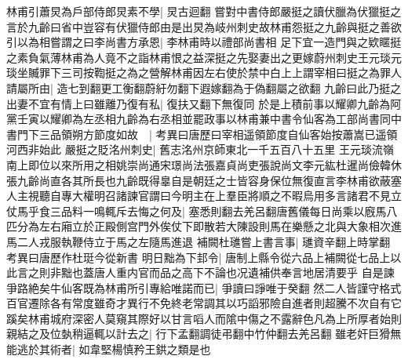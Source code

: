 林甫引蕭炅為戶部侍郎炅素不學|{
	炅古迴翻}
嘗對中書侍郎嚴挺之讀伏臘為伏獵挺之言於九齡曰省中豈容有伏獵侍郎由是出炅為岐州刺史故林甫怨挺之九齡與挺之善欲引以為相嘗謂之曰李尚書方承恩|{
	李林甫時以禮部尚書相}
足下宜一造門與之欵䁥挺之素負氣薄林甫為人竟不之詣林甫恨之益深挺之先娶妻出之更嫁蔚州刺史王元琰元琰坐贓罪下三司按鞫挺之為之營解林甫因左右使於禁中白上上謂宰相曰挺之為罪人請屬所由|{
	造七到翻更工衡翻蔚紆勿翻下遐嫁翻為于偽翻屬之欲翻}
九齡曰此乃挺之出妻不宜有情上曰雖離乃復有私|{
	復扶又翻下無復同}
於是上積前事以耀卿九齡為阿黨壬寅以耀卿為左丞相九齡為右丞相並罷政事以林甫兼中書令仙客為工部尚書同中書門下三品領朔方節度如故　|{
	考異曰唐歷曰宰相遥領節度自仙客始按蕭嵩已遥領河西非始此}
嚴挺之貶洺州刺史|{
	舊志洺州京師東北一千五百八十五里}
王元琰流嶺南上即位以來所用之相姚崇尚通宋璟尚法張嘉貞尚吏張說尚文李元紘杜暹尚儉韓休張九齡尚直各其所長也九齡既得辠自是朝廷之士皆容身保位無復直言李林甫欲蔽塞人主視聽自專大權明召諸諫官謂曰今明主在上羣臣將順之不暇烏用多言諸君不見立仗馬乎食三品料一鳴輒斥去悔之何及|{
	塞悉則翻去羌呂翻唐舊儀每日尚乘以廐馬八匹分為左右廂立於正殿側宫門外俟仗下即散若大陳設則馬在樂懸之北與大象相次進馬二人戎服執鞭侍立于馬之左隨馬進退}
補闕杜璡嘗上書言事|{
	璡資辛翻上時掌翻　考異曰唐歷作杜珽今從新書}
明日黜為下邽令|{
	唐制上縣令從六品上補闕從七品上以此言之則非黜也蓋唐人重内官而品之高下不論也况遺補供奉言地居清要乎}
自是諫爭路絶矣牛仙客既為林甫所引專給唯諾而已|{
	爭讀曰諍唯于癸翻}
然二人皆謹守格式百官遷除各有常度雖奇才異行不免終老常調其以巧謟邪險自進者則超騰不次自有它蹊矣林甫城府深密人莫窺其際好以甘言㗖人而隂中傷之不露辭色凡為上所厚者始則親結之及位埶稍逼輒以計去之|{
	行下孟翻調徒弔翻中竹仲翻去羌呂翻}
雖老奸巨猾無能逃於其術者|{
	如韋堅楊慎矜王鉷之類是也}


